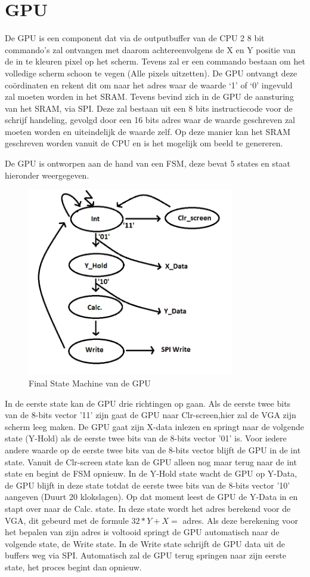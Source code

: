 \documentclass[oneside,dutch]{tudelft-report}
\begin{document}
\chapter{GPU}
De GPU is een component dat via de outputbuffer van de CPU 2 8 bit commando’s zal ontvangen met daarom achtereenvolgens de X en Y positie van de in te kleuren pixel op het scherm. Tevens zal er een commando bestaan om het volledige scherm schoon te vegen (Alle pixels uitzetten). De GPU ontvangt deze coördinaten en rekent dit om naar het adres waar de waarde ‘1’ of ‘0’ ingevuld zal moeten worden in het SRAM. Tevens bevind zich in de GPU de aansturing van het SRAM, via SPI. Deze zal bestaan uit een 8 bits instructiecode voor de schrijf handeling, gevolgd door een 16 bits adres waar de waarde geschreven zal moeten worden en uiteindelijk de waarde zelf. Op deze manier kan het SRAM geschreven worden vanuit de CPU en is het mogelijk om beeld te genereren.

De GPU is ontworpen aan de hand van een FSM, deze bevat 5 states en staat hieronder weergegeven.

\begin{figure}[H]
\center
\includegraphics[width=9cm]{FSM_GPU}
\caption{Final State Machine van de GPU}
\label{sub-GPU}
\end{figure}

In de eerste state kan de GPU drie richtingen op gaan. Als de eerste twee bits van de 8-bits vector '11' zijn gaat de GPU naar Clr-screen,hier zal de VGA zijn scherm leeg maken. De GPU gaat zijn X-data inlezen en springt naar de volgende state (Y-Hold) als de eerste twee bits van de 8-bits vector '01' is. Voor iedere andere waarde op de eerste twee bits van de 8-bits vector blijft de GPU in de int state. Vanuit de Clr-screen state kan de GPU alleen nog maar terug naar de int state en begint de FSM opnieuw. In de Y-Hold state wacht de GPU op Y-Data, de GPU blijft in deze state totdat de eerste twee bits van de 8-bits vector '10' aangeven (Duurt 20 klokslagen). Op dat moment leest de GPU de Y-Data in en stapt over naar de Calc. state. In deze state wordt het adres berekend voor de VGA, dit gebeurd met de formule $32*Y+X =$ adres. Als deze berekening voor het bepalen van zijn adres is voltooid springt de GPU automatisch naar de volgende state, de Write state. In de Write state schrijft de GPU data uit de buffers weg via SPI. Automatisch zal de GPU terug springen naar zijn eerste state, het proces begint dan opnieuw. 
\end{document}
